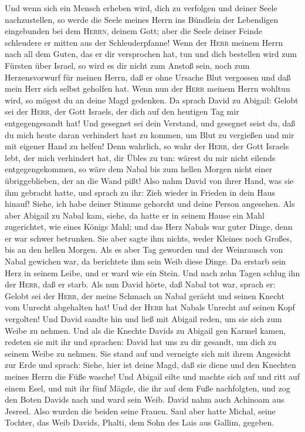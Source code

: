 Und wenn sich ein Mensch erheben wird, dich zu verfolgen und deiner
Seele nachzustellen, so werde die Seele meines Herrn ins Bündlein der
Lebendigen eingebunden bei dem \textsc{Herrn}, deinem Gott; aber die
Seele deiner Feinde schleudere er mitten aus der Schleuderpfanne!
 Wenn der \textsc{Herr} meinem Herrn nach all dem Guten,
das er dir versprochen hat, tun und dich bestellen wird zum Fürsten über
Israel,  so wird es dir nicht zum Anstoß sein, noch zum
Herzensvorwurf für meinen Herrn, daß er ohne Ursache Blut vergossen und
daß mein Herr sich selbst geholfen hat. Wenn nun der \textsc{Herr}
meinem Herrn wohltun wird, so mögest du an deine Magd gedenken.
 Da sprach David zu Abigail: Gelobt sei der
\textsc{Herr}, der Gott Israels, der dich auf den heutigen Tag mir
entgegengesandt hat!  Und gesegnet sei dein Verstand, und
gesegnet seist du, daß du mich heute daran verhindert hast zu kommen, um
Blut zu vergießen und mir mit eigener Hand zu helfen! 
Denn wahrlich, so wahr der \textsc{Herr}, der Gott Israels lebt, der
mich verhindert hat, dir Übles zu tun: wärest du mir nicht eilends
entgegengekommen, so wäre dem Nabal bis zum hellen Morgen nicht einer
übriggeblieben, der an die Wand pißt!  Also nahm David
von ihrer Hand, was sie ihm gebracht hatte, und sprach zu ihr: Zieh
wieder in Frieden in dein Haus hinauf! Siehe, ich habe deiner Stimme
gehorcht und deine Person angesehen.  Als aber Abigail zu
Nabal kam, siehe, da hatte er in seinem Hause ein Mahl zugerichtet, wie
eines Königs Mahl; und das Herz Nabals war guter Dinge, denn er war
schwer betrunken. Sie aber sagte ihm nichts, weder Kleines noch Großes,
bis an den hellen Morgen.  Als es aber Tag geworden und
der Weinrausch von Nabal gewichen war, da berichtete ihm sein Weib diese
Dinge. Da erstarb sein Herz in seinem Leibe, und er ward wie ein Stein.
 Und nach zehn Tagen schlug ihn der \textsc{Herr}, daß er
starb.  Als nun David hörte, daß Nabal tot war, sprach
er: Gelobt sei der \textsc{Herr}, der meine Schmach an Nabal gerächt und
seinen Knecht vom Unrecht abgehalten hat! Und der \textsc{Herr} hat
Nabals Unrecht auf seinen Kopf vergolten! Und David sandte hin und ließ
mit Abigail reden, um sie sich zum Weibe zu nehmen.  Und
als die Knechte Davids zu Abigail gen Karmel kamen, redeten sie mit ihr
und sprachen: David hat uns zu dir gesandt, um dich zu seinem Weibe zu
nehmen.  Sie stand auf und verneigte sich mit ihrem
Angesicht zur Erde und sprach: Siehe, hier ist deine Magd, daß sie diene
und den Knechten meines Herrn die Füße wasche!  Und
Abigail eilte und machte sich auf und ritt auf einem Esel, und mit ihr
fünf Mägde, die ihr auf dem Fuße nachfolgten, und zog den Boten Davids
nach und ward sein Weib.  David nahm auch Achinoam aus
Jesreel. Also wurden die beiden seine Frauen.  Saul aber
hatte Michal, seine Tochter, das Weib Davids, Phalti, dem Sohn des Lais
aus Gallim, gegeben.

